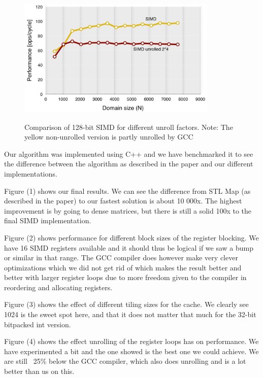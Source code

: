 \documentclass[letterpaper]{article}
\begin{document}
\begin{figure}
  \centering
  \includegraphics[width=0.85\textwidth]{graphs/Unrolling.png}
  \label{fig:benchmarking-unrolling}
  \caption{Comparison of 128-bit SIMD for different unroll factors. Note: The yellow non-unrolled version is partly unrolled by GCC}
\end{figure}


Our algorithm was implemented using C++ and we have benchmarked it to see the difference between the algorithm as described in the paper and our different implementations.

Figure (1) shows our final results. We can see the difference from STL Map (as described in the paper) to our fastest solution is about 10 000x. The highest improvement is by going to dense matrices, but there is still a solid 100x to the final SIMD implementation.

Figure (2) shows performance for different block sizes of the register blocking. We have 16 SIMD registers available and it should thus be logical if we saw a bump or similar in that range. The GCC compiler does however make very clever optimizations which we did not get rid of which makes the result better and better with larger register loops due to more freedom given to the compiler in reordering and allocating registers.

Figure (3) shows the effect of different tiling sizes for the cache. We clearly see 1024 is the sweet spot here, and that it does not matter that much for the 32-bit bitpacked int version.

Figure (4) shows the effect unrolling of the register loops has on performance. We have experimented a bit and the one showed is the best one we could achieve. We are still ~25\% below the GCC compiler, which also does unrolling and is a lot better than us on this.
\end{document}
